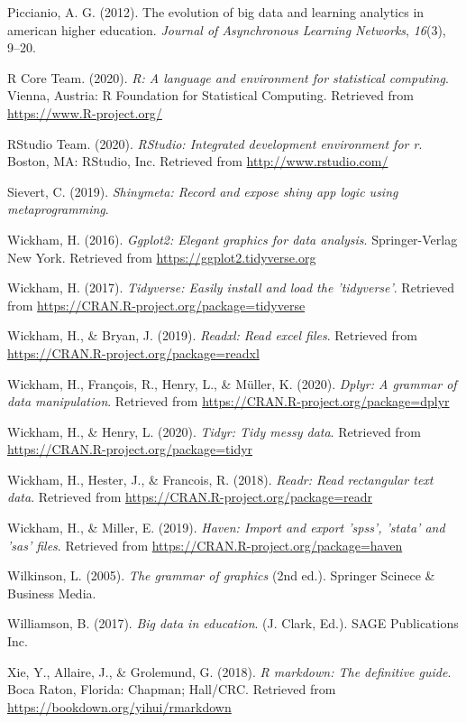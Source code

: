 \documentclass[english,man,floatsintext]{apa6}
\begin{document}
\leavevmode\hypertarget{ref-bigdata1}{}%
Piccianio, A. G. (2012). The evolution of big data and learning analytics in american higher education. \emph{Journal of Asynchronous Learning Networks}, \emph{16}(3), 9--20.

\leavevmode\hypertarget{ref-R-base}{}%
R Core Team. (2020). \emph{R: A language and environment for statistical computing}. Vienna, Austria: R Foundation for Statistical Computing. Retrieved from \url{https://www.R-project.org/}

\leavevmode\hypertarget{ref-rstudio}{}%
RStudio Team. (2020). \emph{RStudio: Integrated development environment for r}. Boston, MA: RStudio, Inc. Retrieved from \url{http://www.rstudio.com/}

\leavevmode\hypertarget{ref-R-shinymeta}{}%
Sievert, C. (2019). \emph{Shinymeta: Record and expose shiny app logic using metaprogramming}.

\leavevmode\hypertarget{ref-R-ggplot2}{}%
Wickham, H. (2016). \emph{Ggplot2: Elegant graphics for data analysis}. Springer-Verlag New York. Retrieved from \url{https://ggplot2.tidyverse.org}

\leavevmode\hypertarget{ref-tidyverse}{}%
Wickham, H. (2017). \emph{Tidyverse: Easily install and load the 'tidyverse'}. Retrieved from \url{https://CRAN.R-project.org/package=tidyverse}

\leavevmode\hypertarget{ref-R-readxl}{}%
Wickham, H., \& Bryan, J. (2019). \emph{Readxl: Read excel files}. Retrieved from \url{https://CRAN.R-project.org/package=readxl}

\leavevmode\hypertarget{ref-R-dplyr}{}%
Wickham, H., François, R., Henry, L., \& Müller, K. (2020). \emph{Dplyr: A grammar of data manipulation}. Retrieved from \url{https://CRAN.R-project.org/package=dplyr}

\leavevmode\hypertarget{ref-R-tidyr}{}%
Wickham, H., \& Henry, L. (2020). \emph{Tidyr: Tidy messy data}. Retrieved from \url{https://CRAN.R-project.org/package=tidyr}

\leavevmode\hypertarget{ref-R-readr}{}%
Wickham, H., Hester, J., \& Francois, R. (2018). \emph{Readr: Read rectangular text data}. Retrieved from \url{https://CRAN.R-project.org/package=readr}

\leavevmode\hypertarget{ref-R-haven}{}%
Wickham, H., \& Miller, E. (2019). \emph{Haven: Import and export 'spss', 'stata' and 'sas' files}. Retrieved from \url{https://CRAN.R-project.org/package=haven}

\leavevmode\hypertarget{ref-grammar}{}%
Wilkinson, L. (2005). \emph{The grammar of graphics} (2nd ed.). Springer Scinece \& Business Media.

\leavevmode\hypertarget{ref-bigdata2}{}%
Williamson, B. (2017). \emph{Big data in education}. (J. Clark, Ed.). SAGE Publications Inc.

\leavevmode\hypertarget{ref-R-rmarkdown}{}%
Xie, Y., Allaire, J., \& Grolemund, G. (2018). \emph{R markdown: The definitive guide}. Boca Raton, Florida: Chapman; Hall/CRC. Retrieved from \url{https://bookdown.org/yihui/rmarkdown}

\endgroup
\end{document}
